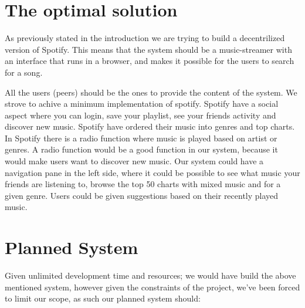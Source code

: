 \section{The optimal solution}
As previously stated in the introduction we are trying to build a decentrilized version of Spotify.
This means that the system should be a music-streamer with an interface that runs in a browser,
and makes it possible for the users to search for a song.

All the users (peers) should be the ones to provide the content of the system.
We strove to achive a minimum implementation of spotify.
Spotify have a social aspect where you can login, save your playlist, see your friends activity and discover new music.
Spotify have ordered their music into genres and top charts.
In Spotify there is a radio function where music is played based on artist or genres.
A radio function would be a good function in our system, because it would make users want to discover new music.
Our system could have a navigation pane in the left side,
 where it could be possible to see what music your friends are listening to,
  browse the top 50 charts with mixed music and for a given genre.
Users could be given suggestions based on their recently played music.

\section{Planned System}
Given unlimited development time and resources; we would have build the above
mentioned system, however given the constraints of the project, we've been
forced to limit our scope, as such our planned system should:

